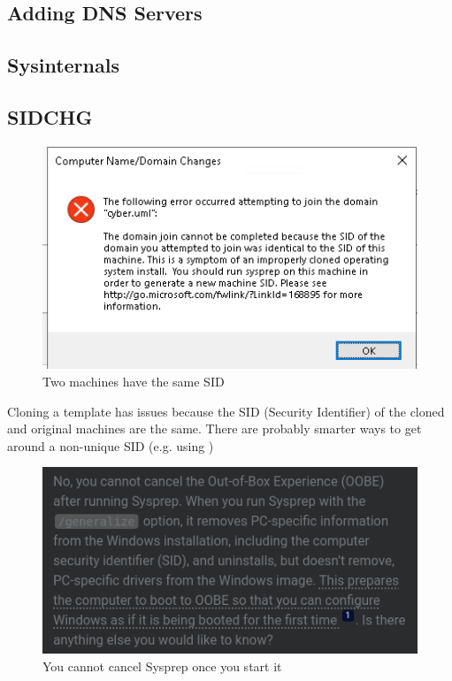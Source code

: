 \documentclass{article}
\begin{document}
\subsection{Adding DNS Servers}

\subsection{Sysinternals}

\subsection{SIDCHG}

\begin{figure}[H]
        \centering
        \includegraphics[width=1\textwidth]{SIDError.png}
        \caption{Two machines have the same SID}
        \label{fig:SIDError}
\end{figure}

Cloning a template has issues because the SID (Security Identifier) of the cloned and original machines are the same.
There are probably smarter ways to get around a non-unique SID (e.g. using )

\begin{figure}[H]
        \centering
        \includegraphics[width=1\textwidth]{dangersOfSysprep.png}
        \caption{You cannot cancel Sysprep once you start it}
        \label{fig:dangersOfSysprep}
    \end{figure}
\end{document}
